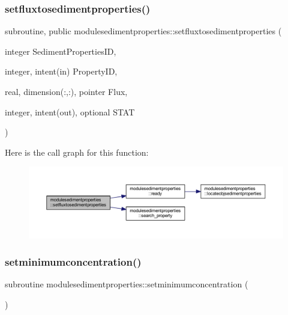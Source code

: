 \subsubsection{\texorpdfstring{setfluxtosedimentproperties()}{setfluxtosedimentproperties()}}
{\footnotesize\ttfamily subroutine, public modulesedimentproperties\+::setfluxtosedimentproperties (\begin{DoxyParamCaption}\item[{integer}]{Sediment\+Properties\+ID,  }\item[{integer, intent(in)}]{Property\+ID,  }\item[{real, dimension(\+:,\+:), pointer}]{Flux,  }\item[{integer, intent(out), optional}]{S\+T\+AT }\end{DoxyParamCaption})}

Here is the call graph for this function\+:\nopagebreak
\begin{figure}[H]
\begin{center}
\leavevmode
\includegraphics[width=350pt]{namespacemodulesedimentproperties_a9049928f5adeb27938b063b548a194af_cgraph}
\end{center}
\end{figure}
\mbox{\label{namespacemodulesedimentproperties_a9f511535dd36e19d03774f384ee21bc9}} 
\subsubsection{\texorpdfstring{setminimumconcentration()}{setminimumconcentration()}}
{\footnotesize\ttfamily subroutine modulesedimentproperties\+::setminimumconcentration (\begin{DoxyParamCaption}{ }\end{DoxyParamCaption})\hspace{0.3cm}{\ttfamily [private]}}

